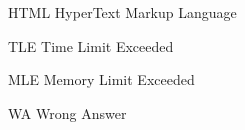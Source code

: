 \begin{siglas}
  \item[HTML] HyperText Markup Language
  \item[TLE] Time Limit Exceeded
  \item[MLE] Memory Limit Exceeded
  \item[WA] Wrong Answer  
\end{siglas}
